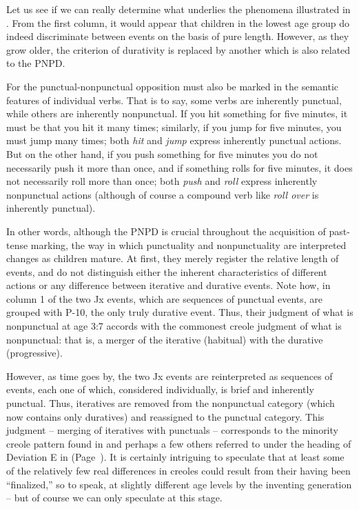 Let us see if we can really determine what underlies the phenomena illustrated in . From the first column, it would appear that children in the lowest age group do indeed discriminate between events on the basis of pure length. However, as they grow older, the criterion of durativity is replaced by another which is also related to the PNPD.

For the punctual-nonpunctual opposition must also be marked in the semantic features of individual verbs. That is to say, some verbs are inherently punctual, while others are inherently nonpunctual. If you hit something for five minutes, it must be that you hit it many
times; similarly, if you jump for five minutes, you must jump many times; both \textit{hit} and \textit{jump} express inherently punctual actions. But on the other hand, if you push something for five minutes you do not necessarily push it more than once, and if something rolls for five minutes, it does not necessarily roll more than once; both \textit{push} and \textit{roll} express inherently nonpunctual actions (although of course a compound verb like \textit{roll over} is inherently punctual).

In other words, although the PNPD is crucial throughout the acquisition of past-tense marking, the way in which punctuality and nonpunctuality are interpreted changes as children mature. At first, they merely register the relative length of events, and do not distinguish either the inherent characteristics of different actions or any difference between iterative and durative events. Note how, in column 1 of  the two Jx events, which are sequences of punctual events, are grouped with P-10, the only truly durative event. Thus, their judgment of what is nonpunctual at age 3:7 accords with the commonest creole judgment of what is nonpunctual: that is, a merger of the iterative (habitual) with the durative (progressive).

However, as time goes by, the two Jx events are reinterpreted as sequences of events, each one of which, considered individually, is brief and inherently punctual. Thus, iteratives are removed from the nonpunctual category (which now contains only duratives) and reassigned to the punctual category. This judgment -- merging of iteratives with punctuals -- corresponds to the minority creole pattern found in  and perhaps a few others referred to under the heading of Deviation E in  (Page~\pageref{majordeviations}). It is certainly intriguing to speculate that at least some of the relatively few real differences in creoles could result from their having been ``finalized,'' so to speak, at slightly different age levels by the inventing generation -- but of course we can only speculate at this stage.

